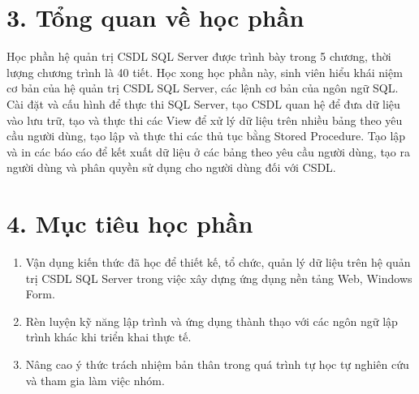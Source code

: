 \documentclass[a4paper,13pt]{article}
\begin{document}
\section*{3. Tổng quan về học phần}
Học phần hệ quản trị CSDL SQL Server được trình bày trong 5 chương, thời lượng chương trình là 40 tiết. Học xong học phần này, sinh viên hiểu khái niệm cơ bản của hệ quản trị CSDL SQL Server, các lệnh cơ bản của ngôn ngữ SQL. Cài đặt và cấu hình để thực thi SQL Server, tạo CSDL quan hệ để đưa dữ liệu vào lưu trữ, tạo và thực thi các View để xử lý dữ liệu trên nhiều bảng theo yêu cầu người dùng, tạo lập và thực thi các thủ tục bằng Stored Procedure. Tạo lập và in các báo cáo để kết xuất dữ liệu ở các bảng theo yêu cầu người dùng, tạo ra người dùng và phân quyền sử dụng cho người dùng đối với CSDL.

\section*{4. Mục tiêu học phần}
\begin{enumerate}[label=4.\arabic*.]
    \item Vận dụng kiến thức đã học để thiết kế, tổ chức, quản lý dữ liệu trên hệ quản trị CSDL SQL Server trong việc xây dựng ứng dụng nền tảng Web, Windows Form.
    \item Rèn luyện kỹ năng lập trình và ứng dụng thành thạo với các ngôn ngữ lập trình khác khi triển khai thực tế.
    \item Nâng cao ý thức trách nhiệm bản thân trong quá trình tự học tự nghiên cứu và tham gia làm việc nhóm.
\end{enumerate}
\end{document}
